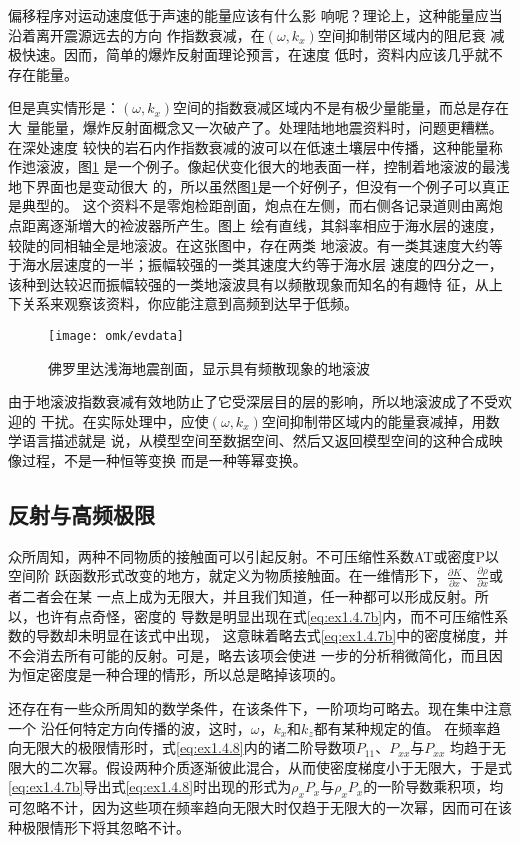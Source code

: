 偏移程序对运动速度低于声速的能量应该有什么影
响呢？理论上，这种能量应当沿着离开震源远去的方向
作指数衰减，在$(\omega,k_x)$空间抑制带区域内的阻尼衰
减极快速。因而，简单的爆炸反射面理论预言，在速度
低时，资料内应该几乎就不存在能量。

但是真实情形是：$(\omega,k_x)$空间的指数衰减区域内不是有极少量能量，而总是存在大
量能量，爆炸反射面概念又一次破产了。处理陆地地震资料时，问题更糟糕。在深处速度
较快的岩石内作指数衰减的波可以在低速土壤层中传播，这种能量称作迆滚波，图\ref{fig:omk/evdata}
是一个例子。像起伏变化很大的地表面一样，控制着地滚波的最浅地下界面也是变动很大
的，所以虽然图\ref{fig:omk/evdata}是一个好例子，但没有一个例子可以真正是典型的。
这个资料不是零炮检距剖面，炮点在左侧，而右侧各记录道则由离炮点距离逐渐増大的裣波器所产生。图上
绘有直线，其斜率相应于海水层的速度，较陡的同相轴全是地滚波。在这张图中，存在两类
地滚波。有一类其速度大约等于海水层速度的一半；振幅较强的一类其速度大约等于海水层
速度的四分之一，该种到达较迟而振幅较强的一类地滚波具有以频散现象而知名的有趣恃
征，从上下关系来观察该资料，你应能注意到高频到达早于低频。
\begin{figure}[H]
\centering
\texttt{[image: omk/evdata]}
\caption[evdata]{佛罗里达浅海地震剖面，显示具有频散现象的地滚波}
\label{fig:omk/evdata}
\end{figure}
由于地滚波指数衰减有效地防止了它受深层目的层的影响，所以地滚波成了不受欢迎的
干扰。在实际处理中，应使$(\omega,k_x)$空间抑制带区域内的能量衰减掉，用数学语言描述就是
说，从模型空间至数据空间、然后又返回模型空间的这种合成映像过程，不是一种恒等变换
而是一种等幂变换。
\subsection{反射与高频极限}
众所周知，两种不同物质的接触面可以引起反射。不可压缩性系数AT或密度P以空间阶
跃函数形式改变的地方，就定义为物质接触面。在一维情形下，$\frac{\partial K}{\partial x}$、$\frac{\partial\rho}{\partial x}$或者二者会在某
一点上成为无限大，并且我们知道，任一种都可以形成反射。所以，也许有点奇怪，密度的
导数是明显出现在式\ref{eq:ex1.4.7b}内，而不可压缩性系数的导数却未明显在该式中出现，
这意昧着略去式\ref{eq:ex1.4.7b}中的密度梯度，并不会消去所有可能的反射。可是，略去该项会使进
一步的分析稍微简化，而且因为恒定密度是一种合理的情形，所以总是略掉该项的。

还存在有一些众所周知的数学条件，在该条件下，一阶项均可略去。现在集中注意一个
沿任何特定方向传播的波，这时，$\omega$，$k_x$和$k_z$都有某种规定的值。
在频率趋向无限大的极限情形时，式\ref{eq:ex1.4.8}内的诸二阶导数项$P_{11}$、$P_{xx}$与$P_{xx}$
均趋于无限大的二次幂。假设两种介质逐渐彼此混合，从而使密度梯度小于无限大，于是式\ref{eq:ex1.4.7b}导出式\ref{eq:ex1.4.8}时出现的形式为$\rho_xP_x$与$\rho_xP_x$的一阶导数乘积项，均可忽略不计，因为这些项在频率趋向无限大时仅趋于无限大的一次幂，因而可在该种极限情形下将其忽略不计。

